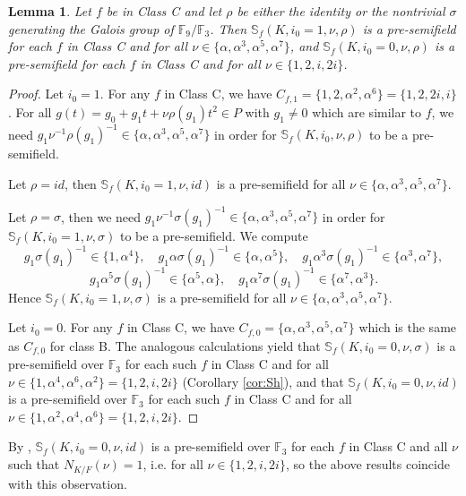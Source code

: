 \documentclass[12pt]{amsart}
\theoremstyle{plain}
\newtheorem{lemma}[theorem]{Lemma}
\theoremstyle{definition}
\numberwithin{equation}{section}
\numberwithin{figure}{section}
\begin{document}
\begin{lemma}
Let $f$ be in Class C and let $\rho$ be either the identity or the nontrivial $\sigma$ generating the Galois group of $\mathbb{F}_9/\mathbb{F}_3$.
Then $\mathbb{S}_f(K,i_0=1,\nu,\rho)$ is a pre-semifield for each $f$ in Class C and  for all $\nu\in \{ \alpha, \alpha^3, \alpha^5,\alpha^7\}$, and $\mathbb{S}_f(K,i_0=0,\nu,\rho)$ is a pre-semifield for each $f$ in Class C and  for all $\nu\in \{ 1,2,i,2i \}$.
\end{lemma}

\begin{proof}
      Let $i_0=1$. For any $f$ in Class C, we have   $C_{f,1} =\{1,2,   \alpha^2,  \alpha^6\}=\{1,2, 2i, i\}$.
      For all $g(t)=g_0+g_1t+\nu\rho(g_{1})t^2\in P$ with $g_{1}\not=0$ which are similar to $f$, we need $ g_{1}\nu^{-1}\rho(g_{1})^{-1} \in
      \{ \alpha, \alpha^3, \alpha^5,\alpha^7\}$ in order for $\mathbb{S}_f(K,i_0,\nu,\rho)$ to be a pre-semifield.

Let $\rho=id$, then $\mathbb{S}_f(K,i_0=1,\nu,id)$ is a pre-semifield for all $\nu\in \{ \alpha, \alpha^3, \alpha^5,\alpha^7\}$.

Let $\rho=\sigma$, then we need $g_{1}\nu^{-1}\sigma(g_{1})^{-1} \in \{ \alpha, \alpha^3, \alpha^5,\alpha^7\}$ in order for $\mathbb{S}_f(K,i_0=1,\nu,\sigma)$ to be a pre-semifield. We compute
$$g_{1}\sigma(g_{1})^{-1} \in \{1,\alpha^4\},\quad g_{1}\alpha\sigma(g_{1})^{-1}\in  \{\alpha, \alpha^5\},
\quad g_{1}\alpha^3\sigma(g_{1})^{-1}\in  \{\alpha^3,\alpha^7\},
 $$
$$g_{1}\alpha^5\sigma(g_{1})^{-1}\in  \{\alpha^5,\alpha\}, \quad  g_{1}\alpha^7\sigma(g_{1})^{-1}\in \{\alpha^7,\alpha^3\}.$$
Hence $\mathbb{S}_f(K,i_0=1,\nu,\sigma)$ is a pre-semifield for all $\nu\in \{ \alpha, \alpha^3, \alpha^5,\alpha^7\}$.

Let $i_0=0$. For any $f$ in Class C, we have   $C_{f,0} =\{ \alpha, \alpha^3, \alpha^5,\alpha^7\}$ which is the same as $C_{f,0}$ for class B. The analogous calculations yield   that
   $\mathbb{S}_f(K,i_0=0,\nu,\sigma)$ is a pre-semifield over $\mathbb{F}_3$  for each such $f$ in Class C and for all $\nu\in \{ 1, \alpha^4,\alpha^6,\alpha^2 \}=\{ 1,2,i,2i \}$ (Corollary \ref{cor:Sh}), and that
   $\mathbb{S}_f(K,i_0=0,\nu,id)$ is a pre-semifield over $\mathbb{F}_3$  for each such $f$ in Class C and for all $\nu\in \{ 1,\alpha^2, \alpha^4, \alpha^6\}=\{ 1,2,i,2i\}$.
\end{proof}

 By \cite[Theorem 7]{Sheekey}, $\mathbb{S}_f(K,i_0=0,\nu,id)$ is a pre-semifield over $\mathbb{F}_3$ for each $f$ in Class C and all $\nu$ such that $N_{K/F}(\nu)=1$, i.e. for all $\nu\in \{ 1,2,i,2i \}$, so the above results coincide with this observation.
\end{document}
